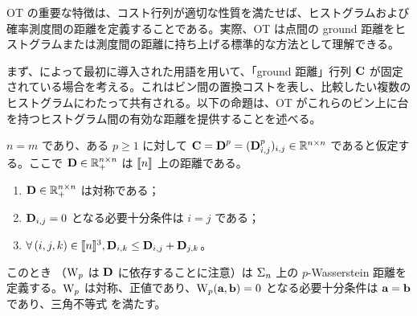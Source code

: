 OT の重要な特徴は、コスト行列が適切な性質を満たせば、ヒストグラムおよび確率測度間の距離を定義することである。実際、OT は点間の ground 距離をヒストグラムまたは測度間の距離に持ち上げる標準的な方法として理解できる。

まず、\citet{RubTomGui00}によって最初に導入された用語を用いて、「ground 距離」行列 $\mathrm{\textbf{C}}$ が固定されている場合を考える。これはビン間の置換コストを表し、比較したい複数のヒストグラムにわたって共有される。以下の命題は、OT がこれらのビン上に台を持つヒストグラム間の有効な距離を提供することを述べる。

\begin{prop}\label{prop-metric-histo}
$n=m$ であり、ある $p \geq 1$ に対して $\mathrm{\textbf{C}}=\mathrm{\textbf{D}}^p=(\mathrm{\textbf{D}}_{i,j}^p)_{i,j} \in \mathbb{R}^{n \times n}$ であると仮定する。ここで $\mathrm{\textbf{D}} \in \mathbb{R}_+^{n \times n}$ は $\llbracket n\rrbracket$ 上の距離である。\ie
\begin{enumerate}[label=(\roman*)]
	\item $\mathrm{\textbf{D}} \in \mathbb{R}_+^{n \times n}$ は対称である；
	\item $\mathrm{\textbf{D}}_{i,j}=0$ となる必要十分条件は $i=j$ である；
	\item $\forall \, (i,j,k) \in \llbracket n\rrbracket^3, \mathrm{\textbf{D}}_{i,k} \leq \mathrm{\textbf{D}}_{i,j}+\mathrm{\textbf{D}}_{j,k}$。
\end{enumerate}
このとき
（$\operatorname{\mathrm{W}}_p$ は $\mathrm{\textbf{D}}$ に依存することに注意）は $\Sigma_n$ 上の $p$-Wasserstein 距離を定義する。\ie $\operatorname{\mathrm{W}}_p$ は対称、正値であり、$\operatorname{\mathrm{W}}_p(\mathrm{\textbf{a}},\mathrm{\textbf{b}})=0$ となる必要十分条件は $\mathrm{\textbf{a}} = \mathrm{\textbf{b}}$ であり、三角不等式
を満たす。
\end{prop}

